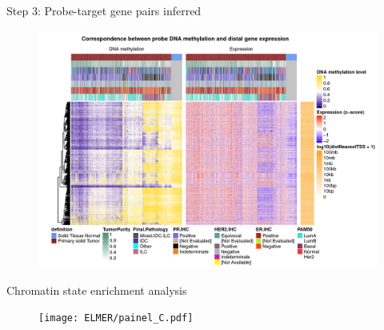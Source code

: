 \documentclass[slidestop,compress,11pt,xcolor=dvipsnames]{beamer}
\begin{document}

\begin{frame}{Step 3: Probe-target gene pairs inferred}
 \vspace*{-0.3cm}
 \begin{figure}
  \centering
  \includegraphics[width=1.0\linewidth]{ELMER/heatmappair.jpg}
 \end{figure}
\end{frame}

\begin{frame}{Chromatin state enrichment analysis}
 \vspace*{-0.4cm}
 \begin{figure}
  \centering
  \texttt{[image: ELMER/painel\_C.pdf]} \end{figure}
\end{frame}
\end{document}
